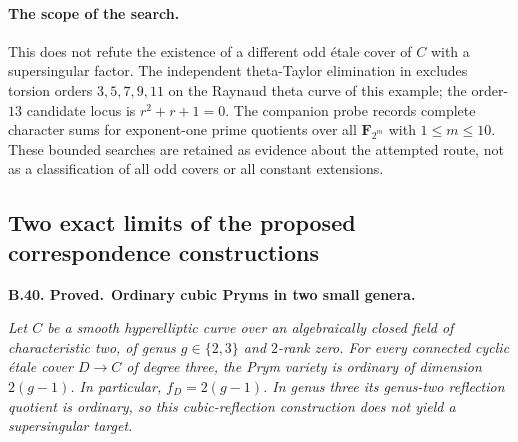 \documentclass[11pt,a4paper]{article}
\newcommand{\F}{\mathbf F}
\newenvironment{claim}[3]{\par\medskip\noindent\hypertarget{#1}{\textbf{#1. #2.}}\ \textbf{#3.}\par\nopagebreak\smallskip\begingroup\itshape}{\endgroup\par\smallskip}
\begin{document}
\paragraph{The scope of the search.}
This does not refute the existence of a different odd
\'etale cover of $C$ with a supersingular factor. The
independent theta-Taylor elimination in
 excludes torsion orders
$3,5,7,9,11$ on the Raynaud theta curve of this example;
the order-$13$ candidate locus is $r^2+r+1=0$.
The companion probe records complete character sums
for exponent-one prime quotients over all
$\F_{2^m}$ with $1\le m\le10$. These bounded searches
are retained as evidence about the attempted route,
not as a classification of all odd covers or all
constant extensions.

\subsection{Two exact limits of the proposed correspondence constructions}

\begin{claim}{B.40}{Proved}{Ordinary cubic Pryms in two small genera}
Let $C$ be a smooth hyperelliptic curve over an algebraically
closed field of characteristic two, of genus $g\in\{2,3\}$
and $2$-rank zero. For every connected cyclic \'etale
cover $D\to C$ of degree three, the Prym variety is
ordinary of dimension $2(g-1)$. In particular,
$f_D=2(g-1)$. In genus three its genus-two reflection
quotient is ordinary, so this cubic-reflection construction
does not yield a supersingular target.
\end{claim}
\end{document}

